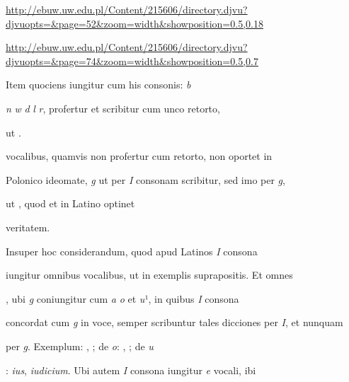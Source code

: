 
\newParkoszpage

{
\url{http://ebuw.uw.edu.pl/Content/215606/directory.djvu?djvuopts=&page=52&zoom=width&showposition=0.5,0.18}

\url{http://ebuw.uw.edu.pl/Content/215606/directory.djvu?djvuopts=&page=74&zoom=width&showposition=0.5,0.7}
}

\bigskip

\obeylines
\mono



\fullpreviouslines


{
\color{blue}

\indentK Item quociens iungitur cum his consonis: \textit{b}

\textit{n} \textit{w} \textit{d} \textit{l} \textit{r}, profertur et scribitur cum unco retorto,

}


\fulllines

ut    .

vocalibus, quamvis non profertur cum  retorto, non oportet in

Polonico ideomate, \textit{g} ut per \textit{I} consonam scribitur, sed imo per \textit{g},

ut    , quod et in Latino optinet

\splitlines

veritatem.

\indentK Insuper hoc considerandum, quod apud Latinos \textit{I} consona

\fulllines

iungitur omnibus vocalibus, ut in exemplis suprapositis. Et omnes 

, ubi \textit{g} coniungitur cum \textit{a} \textit{o} et \textit{u}¹, in quibus \textit{I} consona

concordat cum \textit{g} in voce, semper scribuntur tales dicciones per \textit{I}, et nunquam

per \textit{g}. Exemplum: , ; de \textit{o}: , ; de \textit{u}

: \textit{ius}, \textit{iudicium}. Ubi autem \textit{I} consona iungitur \textit{e} vocali, ibi


